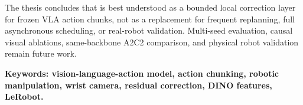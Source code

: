 The thesis concludes that \method{} is best understood as a bounded local correction layer for frozen VLA action chunks, not as a replacement for frequent replanning, full asynchronous scheduling, or real-robot validation. Multi-seed evaluation, causal visual ablations, same-backbone A2C2 comparison, and physical robot validation remain future work.

\vspace{1cm}

\textbf{Keywords: vision-language-action model, action chunking, robotic manipulation, wrist camera, residual correction, DINO features, LeRobot.}
